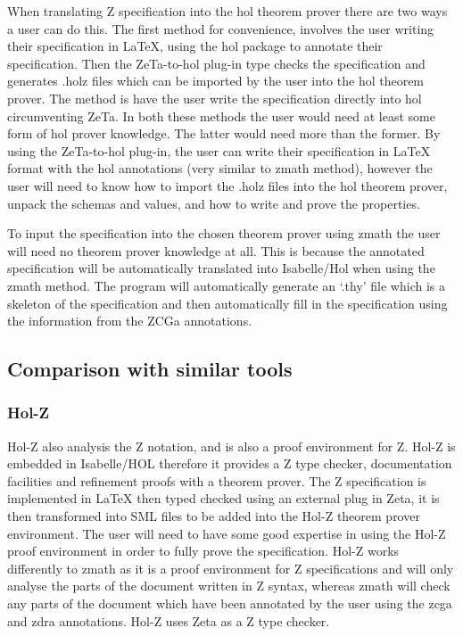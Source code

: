 When translating Z specification into the \gls{hol} theorem prover there are two
ways a user can do this. The first method for convenience, involves the user
writing their specification in \LaTeX{}, using the \gls{hol} package to annotate
their specification. Then the ZeTa-to-\gls{hol} plug-in type checks the
specification and generates .holz files which can be imported by the user into
the \gls{hol} theorem prover. The method is have the user write the
specification directly into \gls{hol} circumventing ZeTa. In both these methods
the user would need at least some form of \gls{hol} prover knowledge. The latter
would need more than the former. By using the ZeTa-to-\gls{hol} plug-in, the
user can write their specification in \LaTeX{} format with the \gls{hol}
annotations (very similar to \gls{zmath} method), however the user will need to
know how to import the .holz files into the \gls{hol} theorem prover, unpack the
schemas and values, and how to write and prove the properties.

To input the specification into the chosen theorem prover using \gls{zmath} the
user will need no theorem prover knowledge at all. This is because the annotated
specification will be automatically translated into Isabelle/Hol when using the
\gls{zmath} method. The program will automatically generate an `.thy' file which
is a skeleton of the specification and then automatically fill in the
specification using the information from the ZCGa annotations.

\subsection{Comparison with similar tools}
\label{subsec:provingSystemsForZ}

\subsubsection{Hol-Z}

Hol-Z \cite{hol-z} also analysis the Z notation, and is also a
proof environment for Z. Hol-Z is embedded in Isabelle/HOL therefore it provides
a Z type checker, documentation facilities and refinement proofs with a theorem
prover. The Z specification is implemented in \LaTeX{} then typed checked using
an external plug in Zeta, it is then transformed into SML files to be added into
the Hol-Z theorem prover environment. The user will need to have some good
expertise in using the Hol-Z proof environment in order to fully prove the
specification. Hol-Z works differently to \gls{zmath} as it is a proof
environment for Z specifications and will only analyse the parts of the document
written in Z syntax, whereas \gls{zmath} will check any parts of the document
which have been annotated by the user using the \gls{zcga} and \gls{zdra}
annotations. Hol-Z uses Zeta \cite{zeta} as a Z type checker.

